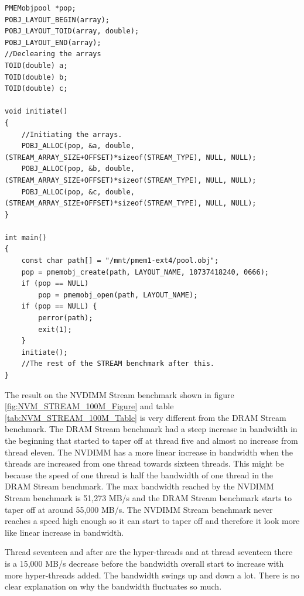 \documentclass[12pt,a4paper,USenglish]{article}      %
\begin{document}
\begin{lstlisting}[caption={Code that has replaced original code.}, label={lst:orgStreamNvdimm}]
PMEMobjpool *pop;
POBJ_LAYOUT_BEGIN(array);
POBJ_LAYOUT_TOID(array, double);
POBJ_LAYOUT_END(array);
//Declearing the arrays
TOID(double) a;
TOID(double) b;
TOID(double) c;

void initiate()
{
	//Initiating the arrays.
	POBJ_ALLOC(pop, &a, double, (STREAM_ARRAY_SIZE+OFFSET)*sizeof(STREAM_TYPE), NULL, NULL);
	POBJ_ALLOC(pop, &b, double, (STREAM_ARRAY_SIZE+OFFSET)*sizeof(STREAM_TYPE), NULL, NULL);
	POBJ_ALLOC(pop, &c, double, (STREAM_ARRAY_SIZE+OFFSET)*sizeof(STREAM_TYPE), NULL, NULL);
}

int main()
{
	const char path[] = "/mnt/pmem1-ext4/pool.obj";
	pop = pmemobj_create(path, LAYOUT_NAME, 10737418240, 0666);
	if (pop == NULL)
		pop = pmemobj_open(path, LAYOUT_NAME);
	if (pop == NULL) {
		perror(path);
		exit(1);
	}
	initiate();
	//The rest of the STREAM benchmark after this.
}
\end{lstlisting}

The result on the NVDIMM Stream benchmark shown in figure \ref{fig:NVM_STREAM_100M_Figure} and table \ref{tab:NVM_STREAM_100M_Table} is very different from the DRAM Stream benchmark. The DRAM Stream benchmark had a steep increase in bandwidth in the beginning that started to taper off at thread five and almost no increase from thread eleven. The NVDIMM has a more linear increase in bandwidth when the threads are increased from one thread towards sixteen threads. 
This might be because the speed of one thread is half the bandwidth of one thread in the DRAM Stream benchmark. 
The max bandwidth reached by the NVDIMM Stream benchmark is 51,273 MB/s and the DRAM Stream benchmark starts to taper off at around 55,000 MB/s. The NVDIMM Stream benchmark never reaches a speed high enough so it can start to taper off and therefore it look more like linear increase in bandwidth.

Thread seventeen and after are the hyper-threads and at thread seventeen there is a 15,000 MB/s decrease before the bandwidth overall start to increase with more hyper-threads added. The bandwidth swings up and down a lot. There is no clear explanation on why the bandwidth fluctuates so much. 
\end{document}
